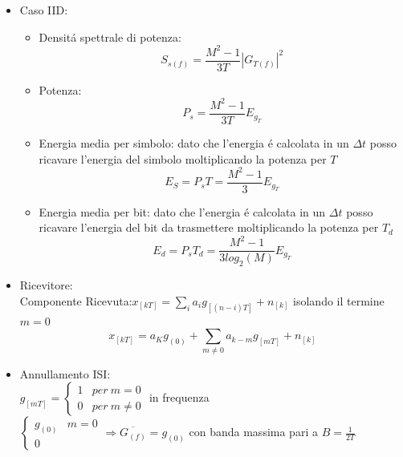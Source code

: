 \begin{itemize}
            \item {Caso IID:
                \begin{itemize}
                    \item {Densitá spettrale di potenza:
                        \[
                            S_{s(f)} = \frac{M^2-1}{3T}\left|G_{T(f)}\right|^2
                        \]
                    }
                    \item {Potenza:
                        \[
                            P_s = \frac{M^2-1}{3T}E_{g_T}
                        \]
                    }
                    \item {Energia media per simbolo: dato che l'energia é calcolata in un $\Delta t$ posso ricavare l'energia del simbolo moltiplicando la potenza per $T$
                        \[
                            E_S = P_sT = \frac{M^2-1}{3}E_{g_T}
                        \]
                    }
                    \item {Energia media per bit: dato che l'energia é calcolata in un $\Delta t$ posso ricavare l'energia del bit da trasmettere
                    moltiplicando la potenza per $T_d$
                        \[
                            E_d = P_sT_d = \frac{M^2-1}{3log_2(M)}E_{g_T}
                        \]
                    }
                \end{itemize}
            }
            \item {Ricevitore:\\
                Componente Ricevuta:$x_{[kT]} = \sum_{i}a_ig_{[(n-i)T]}+n_{[k]}$
                isolando il termine $m=0$
                \[
                    x_{[kT]} = a_Kg_{(0)} + \sum_{m\neq 0}a_{k-m}g_{[mT]}+n_{[k]}    
                \]
            }
            \item {Annullamento ISI:\\ 
                $g_{[mT]} = 
                \begin{cases}
                    1   &per \ m=0\nonumber \\
                    0   &per \ m\neq 0\nonumber
                \end{cases}$
                in frequenza\\
                $
                \begin{cases}
                    g_{(0)} & m=0\nonumber \\
                    0 &\nonumber
                \end{cases}  \Rightarrow \overline{G_{(f)}} = g_{(0)} 
                $
                con banda massima pari a $B=\frac{1}{2T}$
            }
        \end{itemize}
